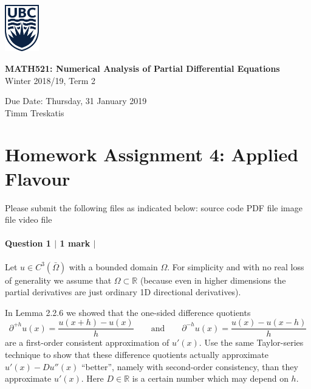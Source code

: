 \documentclass[10pt,letterpaper]{scrartcl}
\begin{document}
\begin{minipage}{.2\textwidth}
\includegraphics[width=42pt]{ubc-logo.png}
\end{minipage}
\hfill
\begin{minipage}{.75\textwidth}
\setlength{\parskip}{6pt}
\begin{flushright}
{
\sffamily
\textbf{MATH521: Numerical Analysis of Partial Differential Equations}\\
Winter 2018/19, Term 2

Due Date: Thursday, 31 January 2019\\
Timm Treskatis
}
\end{flushright}
\end{minipage}

\section*{Homework Assignment 4: Applied Flavour}

Please submit the following files as indicated below: \hfill \faFileCodeO \: source code \hfill \faFilePdfO \: PDF file \hfill \faFilePictureO \: image file \hfill \faFileMovieO \: video file

\paragraph*{Question 1 $\vert$ 1 mark $\vert$ \faFilePdfO}

Let $u \in C^3(\bar{\Omega})$ with a bounded domain $\Omega$. For simplicity and with no real loss of generality we assume that $\Omega \subset \mathds{R}$ (because even in higher dimensions the partial derivatives are just ordinary 1D directional derivatives).

In Lemma 2.2.6 we showed that the one-sided difference quotients 
\begin{equation*}
\partial^{+h} u(x) = \frac{u(x+h)-u(x)}{h} \qquad \text{and} \qquad \partial^{-h} u(x) = \frac{u(x)-u(x-h)}{h}
\end{equation*}
are a first-order consistent approximation of $u'(x)$. Use the same Taylor-series technique to show that these difference quotients actually approximate $u'(x) - Du''(x)$ ``better'', namely with second-order consistency, than they approximate $u'(x)$. Here $D\in \mathds{R}$ is a certain number which may depend on $h$.
\end{document}
